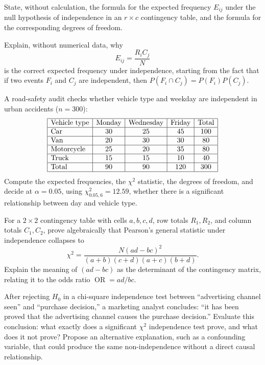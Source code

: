 \begin{problema}\label{prob:d20c80f}
State, without calculation, the formula for the expected frequency $E_{ij}$ under the null hypothesis of independence in an $r\times c$ contingency table, and the formula for the corresponding degrees of freedom.
\end{problema}

\begin{problema}\label{prob:b002759}
Explain, without numerical data, why
\[
	E_{ij}=\frac{R_iC_j}{N}
\]
is the correct expected frequency under independence, starting from the fact that if two events $F_i$ and $C_j$ are independent, then $P(F_i\cap C_j)=P(F_i)P(C_j)$.
\end{problema}

\begin{problema}\label{prob:147e151}
A road-safety audit checks whether vehicle type and weekday are independent in urban accidents ($n=300$):
\[
\begin{array}{|l|c|c|c|c|}\hline
\text{Vehicle type} & \text{Monday} & \text{Wednesday} & \text{Friday} & \text{Total}\\\hline
\text{Car} & 30 & 25 & 45 & 100\\\hline
\text{Van} & 20 & 30 & 30 & 80\\\hline
\text{Motorcycle} & 25 & 20 & 35 & 80\\\hline
\text{Truck} & 15 & 15 & 10 & 40\\\hline
\text{Total} & 90 & 90 & 120 & 300\\\hline
\end{array}
\]
Compute the expected frequencies, the $\chi^2$ statistic, the degrees of freedom, and decide at $\alpha=0.05$, using $\chi^2_{0.05,6}=12.59$, whether there is a significant relationship between day and vehicle type.
\end{problema}

\begin{problema}\label{prob:3c6b064}
For a $2\times2$ contingency table with cells $a,b,c,d$, row totals $R_1,R_2$, and column totals $C_1,C_2$, prove algebraically that Pearson's general statistic under independence collapses to
\[
	\chi^2=\frac{N(ad-bc)^2}{(a+b)(c+d)(a+c)(b+d)}.
\]
Explain the meaning of $(ad-bc)$ as the determinant of the contingency matrix, relating it to the odds ratio $\operatorname{OR}=ad/bc$.
\end{problema}

\begin{problema}\label{prob:878a46f}
After rejecting $H_0$ in a chi-square independence test between ``advertising channel seen'' and ``purchase decision,'' a marketing analyst concludes: ``it has been proved that the advertising channel causes the purchase decision.'' Evaluate this conclusion: what exactly does a significant $\chi^2$ independence test prove, and what does it not prove? Propose an alternative explanation, such as a confounding variable, that could produce the same non-independence without a direct causal relationship.
\end{problema}

